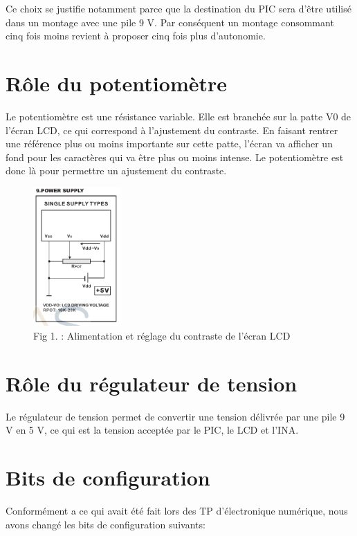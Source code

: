 \documentclass[a4paper,11pt,titlepage]{article}
\begin{document}
Ce choix se justifie notamment parce que la destination du PIC sera d'être utilisé dans un montage avec une pile 9 V. Par conséquent un montage consommant cinq fois moins revient à proposer cinq fois plus d'autonomie. 

\section{Rôle du potentiomètre}
Le potentiomètre est une résistance variable. Elle est branchée sur la patte V0 de l'écran LCD, ce qui correspond à l'ajustement du contraste. En faisant rentrer une référence plus ou moins importante sur cette patte, l'écran va afficher un fond pour les caractères qui va être plus ou moins intense. Le potentiomètre est donc là pour permettre un ajustement du contraste.

\begin{figure}[h]
  \begin{center}
    \includegraphics[width=0.3\textwidth]{img/LCD_Supply.png}
    \caption{Fig 1. : Alimentation et réglage du contraste de l'écran LCD}
    \label{fig:}
  \end{center}
\end{figure}

\section{Rôle du régulateur de tension}
Le régulateur de tension permet de convertir une tension délivrée par une pile 9 V en 5 V, ce qui est la tension acceptée par le PIC, le LCD et l'INA.

\section{Bits de configuration}

Conformément a ce qui avait été fait lors des TP d'électronique numérique, nous avons changé les bits de configuration suivants:\\
\end{document}
